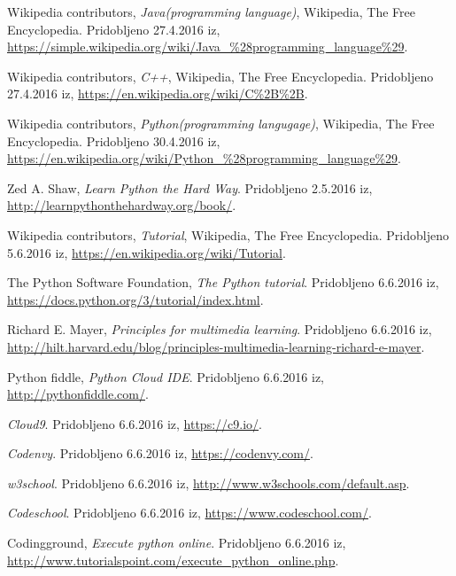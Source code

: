 \begin{thebibliography}{9}
 Wikipedia contributors, \emph{Java(programming
    language)}, Wikipedia, The Free Encyclopedia. Pridobljeno
  27.4.2016 iz,
  \url{https://simple.wikipedia.org/wiki/Java_%28programming_language%29}.

 Wikipedia contributors, \emph{C++}, Wikipedia, The
  Free Encyclopedia. Pridobljeno 27.4.2016 iz,
  \url{https://en.wikipedia.org/wiki/C%2B%2B}.

 Wikipedia contributors, \emph{Python(programming
    langugage)}, Wikipedia, The
  Free Encyclopedia. Pridobljeno 30.4.2016 iz,
  \url{https://en.wikipedia.org/wiki/Python_%28programming_language%29}.

  Zed A. Shaw, \emph{Learn Python the Hard Way}. Pridobljeno 2.5.2016
  iz, \url{http://learnpythonthehardway.org/book/}.

 Wikipedia contributors, \emph{Tutorial},
  Wikipedia, The Free Encyclopedia. Pridobljeno 5.6.2016 iz,
  \url{https://en.wikipedia.org/wiki/Tutorial}.

 The Python Software Foundation, \emph{The
    Python tutorial}. Pridobljeno 6.6.2016 iz,
  \url{https://docs.python.org/3/tutorial/index.html}.

 Richard E. Mayer, \emph{Principles for multimedia learning}. Pridobljeno 6.6.2016 iz,
  \url{http://hilt.harvard.edu/blog/principles-multimedia-learning-richard-e-mayer}.


 Python fiddle, \emph{Python Cloud
    IDE}. Pridobljeno 6.6.2016 iz,
  \url{http://pythonfiddle.com/}.

 \emph{Cloud9}. Pridobljeno 6.6.2016 iz,
  \url{https://c9.io/}.

 \emph{Codenvy}. Pridobljeno 6.6.2016 iz,
  \url{https://codenvy.com/}.

 \emph{w3school}. Pridobljeno 6.6.2016 iz,
  \url{http://www.w3schools.com/default.asp}.

 \emph{Codeschool}. Pridobljeno 6.6.2016 iz,
  \url{https://www.codeschool.com/}.







 Codingground, \emph{Execute python
    online}. Pridobljeno 6.6.2016 iz,
  \url{http://www.tutorialspoint.com/execute_python_online.php}.






\end{thebibliography}
